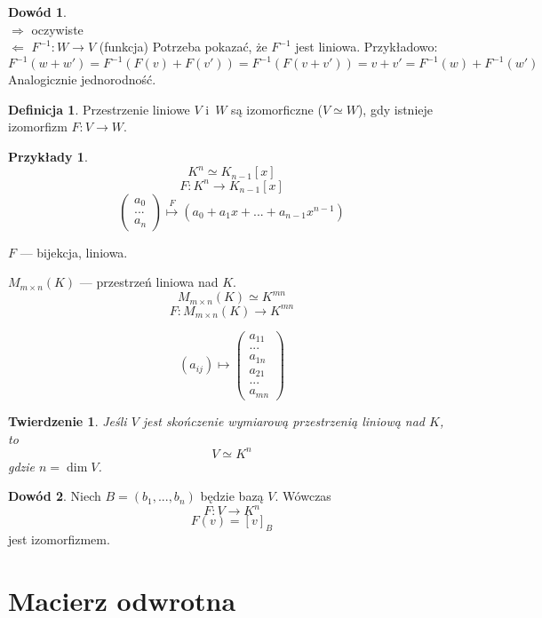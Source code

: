 \documentclass[12pt,a4paper]{article}
\theoremstyle{plain}
\newtheorem{tw}{Twierdzenie}[section]
\theoremstyle{definition}
\theoremstyle{definition}
\newtheorem{df}{Definicja}[section]
\theoremstyle{definition}
\theoremstyle{definition}
\newtheorem*{dd}{Dowód}
\theoremstyle{definition}
\theoremstyle{definition}
\theoremstyle{definition}
\newtheorem*{przy}{Przykłady}
\theoremstyle{definition}
\theoremstyle{definition}
\begin{document}
\begin{dd} ~\\
    $\Rightarrow$ oczywiste\\
  $\Leftarrow$ $F^{-1}: W \rightarrow V$ (funkcja)
  Potrzeba pokazać, że $F^{-1}$ jest liniowa. Przykładowo:
  $$F^{-1}(w+w')=F^{-1}(F(v)+F(v'))=F^{-1}(F(v+v'))=v+v'=F^{-1}(w)+F^{-1}(w')$$ 
  Analogicznie jednorodność.
\end{dd}

\begin{df}
    Przestrzenie liniowe $V$ i~$W$ są izomorficzne ($V \simeq W$), gdy istnieje
    izomorfizm $F: V \rightarrow W$.
\end{df}

\begin{przy}
    \[K^n \simeq K_{n-1}[x]\]
    \[F: K^n \rightarrow K_{n-1}[x]\]
    \[\begin{pmatrix}a_0\\...\\a_n\end{pmatrix} \overset{F}{\longmapsto}
    \left(a_0+a_1x+...+a_{n-1}x^{n-1}\right)\]
    
    $F$ --- bijekcja, liniowa.
    
    \vspace{5mm}
    $M_{m\times n}(K)$ --- przestrzeń liniowa nad $K$.
  \[M_{m\times n}(K) \simeq K^{mn}\]
  \[F: M_{m\times n}(K) \rightarrow K^{mn}\]

  \[(a_{ij}) \longmapsto \begin{pmatrix}a_{11}\\...\\a_{1n}\\
    a_{21}\\...\\a_{mn}\end{pmatrix}\]
\end{przy}

\begin{tw}
    Jeśli $V$ jest skończenie wymiarową przestrzenią liniową nad $K$, to
  \[V \simeq K^n\]
  gdzie $n=\dim V$.
\end{tw}

\begin{dd}
    Niech $B=(b_1, ..., b_n)$ będzie bazą $V$. Wówczas
  \[F: V \rightarrow K^n\]
  \[F(v) = [v]_B\]
  jest izomorfizmem.
\end{dd}

\section{Macierz odwrotna}
\end{document}
